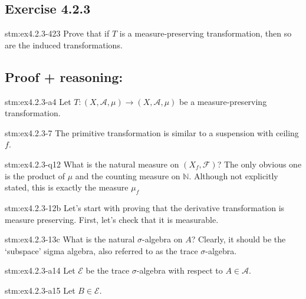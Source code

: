 \subsection*{Exercise 4.2.3}

\begin{exercise}{stm:ex4.2.3-423}
Prove that if $T$ is a measure-preserving transformation, then so are the induced transformations.
\end{exercise}

\subsection*{Proof {\color{blue}+ reasoning}:}

\begin{statement}{stm:ex4.2.3-a4}
Let $T : (X, \mathcal{A}, \mu) \to (X, \mathcal{A}, \mu)$ be a measure-preserving transformation.
\end{statement}

\begin{explanation}{stm:ex4.2.3-7}
The primitive transformation is similar to a suspension with ceiling $f$.
\end{explanation}

\begin{explanation}{stm:ex4.2.3-q12}
What is the natural measure on $(X_f, \mathcal{F})$? The only obvious one is the product of $\mu$ and the counting measure on $\mathbb{N}$. Although not explicitly stated, this is exactly the measure $\mu_f$
\end{explanation}

\begin{statement}{stm:ex4.2.3-12b}
Let's start with proving that the derivative transformation is measure preserving. First, let's check that it is measurable. 
\end{statement}

\begin{explanation}{stm:ex4.2.3-13c}
What is the natural $\sigma$-algebra on $A$? Clearly, it should be the ‘subspace’ sigma algebra, also referred to as the trace $\sigma$-algebra.
\end{explanation}

\begin{statement}{stm:ex4.2.3-a14}
Let $\mathcal{E}$ be the trace $\sigma$-algebra with respect to $A \in \mathcal{A}$.
\end{statement}

\begin{statement}{stm:ex4.2.3-a15}
Let $B \in \mathcal{E}$.
\end{statement}

